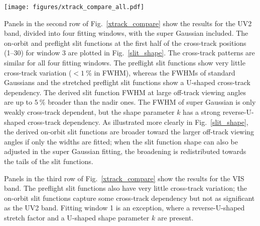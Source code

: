 \documentclass[amt,manuscript]{copernicus}
\begin{document}
\begin{figure*}[tbhp]
\texttt{[image: figures/xtrack\_compare\_all.pdf]}
\caption{Comparisons of the FWHMs of on-orbit slit functions derived from the average OMI irradiance over 2005--2007 with the preflight ones for all three OMI bands, each divided into four fitting windows as shown in Fig.~\ref{ss_demo}. Because the preflight slit functions vary continuously with wavelength, the ranges of preflight slit function FWHMs within the spectral window are plotted as the gray bands. The super Gaussian shape parameter $k$ for the UV2 and VIS fitting windows are also shown with vertical axises on the right.}
\label{xtrack_compare}
\end{figure*}
Panels in the second row of Fig.~\ref{xtrack_compare} show the results for the UV2 band, divided into four fitting windows, with the super Gaussian included. The on-orbit and preflight slit functions at the first half of the cross-track positions (1--30) for window 3 are plotted in Fig.~\ref{slit_shape}. The cross-track patterns are similar for all four fitting windows. The preflight slit functions show very little cross-track variation ($<1~\%$ in FWHM), whereas the FWHMs of standard Gaussians and the stretched preflight slit functions show a U-shaped cross-track dependency. The derived slit function FWHM at large off-track viewing angles are up to $5~\%$ broader than the nadir ones. The FWHM of super Gaussian is only weakly cross-track dependent, but the shape parameter $k$ has a strong reverse-U-shaped cross-track dependency. As illustrated more clearly in Fig.~\ref{slit_shape}, the derived on-orbit slit functions are broader toward the larger off-track viewing angles if only the widths are fitted; when the slit function shape can also be adjusted in the super Gaussian fitting, the broadening is redistributed towards the tails of the slit functions.

Panels in the third row of Fig.~\ref{xtrack_compare} show the results for the VIS band. The preflight slit functions also have very little cross-track variation; the on-orbit slit functions capture some cross-track dependency but not as significant as the UV2 band. Fitting window 1 is an exception, where a reverse-U-shaped stretch factor and a U-shaped shape parameter $k$ are present.
\end{document}
